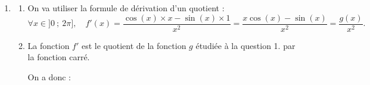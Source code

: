 \begin{enumerate}
\begin{enumerate}
\begin{center}
\end{center}

\item La fonction $g$ est continue (car dérivable) sur $[\pi~;~2\pi]$, sur cet intervalle, elle est strictement croissante.

De plus, 0 est une valeur intermédiaire entre $f(\pi)=-\pi$ et $f(2\pi)=2\pi$.

D'après le corollaire du théorème des valeurs intermédiaires, il existe donc une unique solution à l'équation $g(x)=0$ dans l'intervalle $[0~;~2\pi]$, solution que l'on note $\alpha$.

\item On peut étoffer le tableau de variations précédent avec $\alpha$


\begin{center}
\end{center}

Sur $[0~;~\alpha]$, la fonction $g$ est donc à valeurs négatives, puis sur $[\alpha~;~2\pi]$, elle est  à valeurs positives.


\end{enumerate}

\item \begin{enumerate}
\item On va utiliser la formule de dérivation d'un quotient :
\[
\forall x\in ]0~;~2\pi],\quad f'(x)=\dfrac{\cos(x)\times x-\sin(x)\times 1}{x^2}=\dfrac{x\cos(x)-\sin(x)}{x^2}=\dfrac{g(x)}{x^2}.
\]

\item La fonction $f'$ est le quotient de la fonction $g$ étudiée à la question 1. par la fonction carré.

On a donc :

\begin{center}
\end{center}
\end{enumerate}
\end{enumerate}

